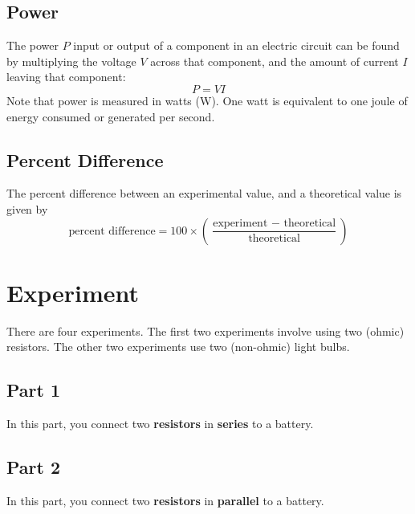\subsection{Power}
The power $P$ input or output of a component in an electric circuit can be found by multiplying the voltage $V$ across that component, and the amount of current $I$ leaving that component:
\begin{equation}
	P = VI
\end{equation}
Note that power is measured in watts (W). One watt is equivalent to one joule of energy consumed or generated per second.
\subsection{Percent Difference}
The percent difference between an experimental value, and a theoretical value is given by
\begin{equation}
	\text{percent difference} = 100 \times \left( \frac{\text{experiment } - \text{ theoretical}}{\text{theoretical}} \right)
\end{equation}
\section{Experiment}
There are four experiments. The first two experiments involve using two (ohmic) resistors. The other two experiments use two (non-ohmic) light bulbs.
\subsection{Part 1}
In this part, you connect two \textbf{resistors} in \textbf{series} to a battery.
\subsection{Part 2}
In this part, you connect two \textbf{resistors} in \textbf{parallel} to a battery.
